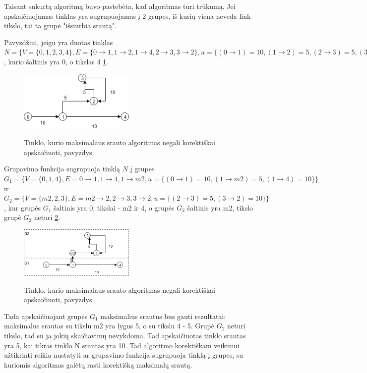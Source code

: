 Taisant sukurtą algoritmą buvo pastebėta, kad algoritmas turi trūkumą. Jei apskaičiuojamas tinklas yra sugrupuojamas į 2 grupes, iš kurių viena neveda link tikslo, tai ta grupė "išsiurbia srautą".

Pavyzdžiui, jeigu yra duotas tinklas $N=\{V=\{0, 1, 2, 3, 4\}, E=\{0 \rightarrow 1, 1 \rightarrow 2, 1 \rightarrow 4, 2 \rightarrow 3, 3 \rightarrow 2\}, u=\{(0 \rightarrow 1) = 10, (1 \rightarrow 2) = 5, (2 \rightarrow 3) = 5, (3 \rightarrow 2) = 10, (1 \rightarrow 4) = 10\}\}$, kurio šaltinis yra 0, o tikslas 4  \ref{fig:trukumas}.
\begin{figure}[h]
	\caption{Tinklo, kurio maksimalaus srauto algoritmas negali korektiškai apskaičiuoti, pavyzdys}
	\centering
	\includegraphics[width=0.5\textwidth]{img/trukumas.png}
	\label{fig:trukumas}
\end{figure}

Grupavimo funkcija sugrupuoja tinklą $N$ į grupes $G_1=\{V=\{0, 1, 4\}, E={0 \rightarrow 1, 1 \rightarrow 4, 1 \rightarrow m2}, u=\{(0 \rightarrow 1) = 10, (1 \rightarrow m2) = 5, (1 \rightarrow 4) = 10\}\}$ ir  $G_2=\{V=\{m2, 2, 3\}, E={m2 \rightarrow 2, 2 \rightarrow 3, 3 \rightarrow2}, u=\{(2 \rightarrow 3) = 5, (3 \rightarrow 2) = 10\}\}$, kur grupės $G_1$ šaltinis yra 0,  tikslai - m2 ir 4, o grupės $G_2$ šaltinis yra m2, tikslo grupė $G_2$ neturi  \ref{fig:trukumoGrupes}.
\begin{figure}[h]
	\caption{Tinklo, kurio maksimalaus srauto algoritmas negali korektiškai apskaičiuoti, pavyzdys}
	\centering
	\includegraphics[width=0.5\textwidth]{img/trukumoGrupes.png}
	\label{fig:trukumoGrupes}
\end{figure}

Tada apskaičiuojant grupės $G_1$ maksimalius srautus bus gauti rezultatai: maksimalus srautas su tikslu m2 yra lygus 5, o su tikslu 4 - 5. Grupė $G_2$ neturi tikslo, tad su ja jokių skaičiavimų nevykdoma. Tad apskaičiuotas tinklo srautas yra 5, kai tikras tinklo N srautas yra 10. Tad algoritmo korektiškam veikimui užtikrinti reikia nustatyti ar grupavimo funkcija sugrupuoja tinklą į grupes, su kuriomis algoritmas galėtų rasti korektišką maksimalų srautą.